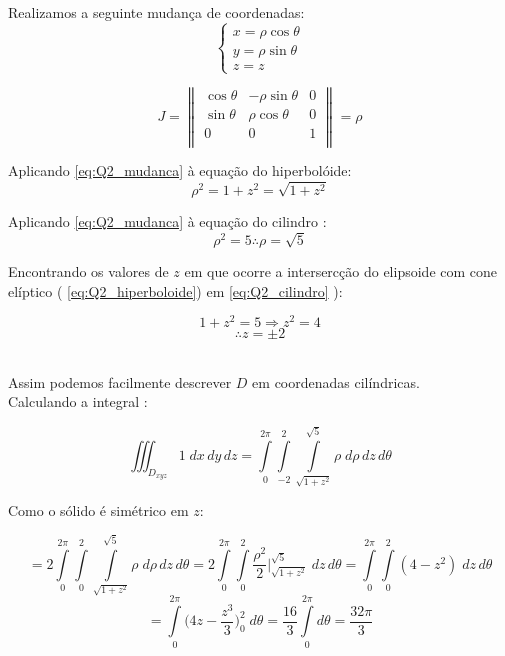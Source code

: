 \documentclass[12pt,a4paper]{article}
\begin{document}
Realizamos a seguinte mudança de coordenadas:
\begin{equation}
\left\{\begin{array}{ll}
x=\rho\cos\theta\\
y= \rho\sin\theta\\
z = z
\end{array}\right.
\label{eq:Q2_mudanca}
\end{equation}

\begin{equation}
J = \begin{Vmatrix}
\cos\theta & -\rho\sin\theta & 0 \\
\sin\theta & \rho\cos\theta & 0 \\
0 & 0 & 1 \\
\end{Vmatrix} = \rho
\label{eq:Q2_Jac}
\end{equation}

Aplicando \eqref{eq:Q2_mudanca} \`a equaç\~{a}o do hiperbolóide:
\begin{equation}
\rho^2 = 1 + z^2 = \sqrt{1 + z^2}
\label{eq:Q2_hiperboloide}
\end{equation}

Aplicando \eqref{eq:Q2_mudanca} \`a equaç\~{a}o do cilindro :
\begin{equation}
\rho^2 = 5 \therefore \rho = \sqrt{5}
\label{eq:Q2_cilindro}
\end{equation}

Encontrando os valores de $z$ em que ocorre a intersercção do elipsoide com cone elíptico ( \eqref{eq:Q2_hiperboloide}) em \eqref{eq:Q2_cilindro} ):

$$ 1 + z^2 = 5 \Rightarrow z^2 = 4 $$
\begin{equation}
\therefore z = \pm 2
\label{eq:Q2_limitesDeZ}
\end{equation} \

Assim podemos facilmente descrever $D$ em coordenadas cilíndricas. \\

Calculando a integral : \

$$ \iiint_{D_{xyz}}{1}\;dx\,dy\,dz  = \int\limits_{0}^{2\pi} \int\limits_{-2}^{2}  \int\limits_{\sqrt{1+z^2}}^{\sqrt{5}}  \rho \;d\rho\, dz\,d\theta $$

Como o sólido é simétrico em $z$:

$$ = 2\int\limits_{0}^{2\pi} \int\limits_{0}^{2}  \int\limits_{\sqrt{1+z^2}}^{\sqrt{5}}  \rho \;d\rho\, dz\,d\theta =  2\int\limits_{0}^{2\pi} \int\limits_{0}^{2}   \frac{\rho^2}{2} \Big|_{\sqrt{1+z^2}}^{\sqrt{5}}  \; dz\,d\theta = \int\limits_{0}^{2\pi} \int\limits_{0}^{2}   (4-z^2)  \; dz\,d\theta $$
$$ = \int\limits_{0}^{2\pi}    \Big(4z-\frac{z^3}{3}\Big)_{0}^{2}  \; d\theta = \frac{16}{3} \int\limits_{0}^{2\pi} d\theta = \frac{32\pi}{3} $$
\end{document}
